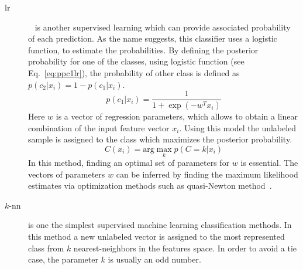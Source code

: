 \begin{description}
\item[\acl{lr}]~\cite{cox1958regression} is another supervised learning which can provide associated probability of each prediction.
As the name suggests, this classifier uses a logistic function, to estimate the probabilities.
By defining the posterior probability for one of the classes, using logistic function (see Eq.~\ref{eq:ppc1lr}), the probability of other class is defined as $p(c_{2}|x_{i}) = 1 - p(c_{1}|x_{i})$.
\begin{equation} \label{eq:ppc1lr}
p(c_{1}|x_{i}) = \frac{1}{1+\exp(-w^{T}x_{i})}
\end{equation}
\noindent Here $w$ is a vector of regression parameters, which allows to obtain a linear combination of the input feature vector $x_{i}$.
Using this model the unlabeled sample is assigned to the class which maximizes the posterior probability. 
\begin{equation}
C(x_{i}) =  \text{arg}\max\limits_{k} p(C = k| x_{i})
\end{equation}
In this method, finding an optimal set of parameters for $w$ is essential.
The vectors of parameters $w$ can be inferred by finding the maximum likelihood estimates via optimization methods such as quasi-Newton method~\cite{byrd1994representations}.\\
 
\item[$k$-\acl{nn}] is one the simplest supervised machine learning classification methods.
In this method a new unlabeled vector is assigned to the most represented class from $k$ nearest-neighbors in the features space.
In order to avoid a tie case, the parameter $k$ is usually an odd number.

\end{description}




